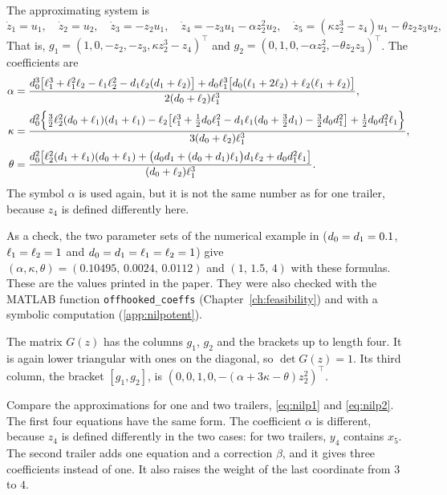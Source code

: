 The approximating system is
\begin{equation}
  \dot z_1=u_1,\quad \dot z_2=u_2,\quad \dot z_3=-z_2u_1,\quad
  \dot z_4=-z_3u_1-\alpha z_2^{2}u_2,\quad
  \dot z_5=(\kappa z_2^{3}-z_4)u_1-\theta z_2z_3u_2 ,
  \label{eq:nilp2}
\end{equation}
That is, $g_1=(1,0,-z_2,-z_3,\kappa z_2^3-z_4)^\top$ and
$g_2=(0,1,0,-\alpha z_2^2,-\theta z_2z_3)^\top$. The coefficients are
\begin{align}
  \alpha&=\frac{d_0^{3}\bigl[\ell_1^{3}+\ell_1^{2}\ell_2-\ell_1\ell_2^{2}-d_1\ell_2(d_1+\ell_2)\bigr]
         +d_0\ell_1^{3}\bigl[d_0(\ell_1+2\ell_2)+\ell_2(\ell_1+\ell_2)\bigr]}
         {2(d_0+\ell_2)\ell_1^{3}},\\[2pt]
  \kappa&=\frac{d_0^{2}\Bigl\{\tfrac32\ell_2^{2}(d_0+\ell_1)(d_1+\ell_1)
         -\ell_2\bigl[\ell_1^{3}+\tfrac12d_0\ell_1^{2}-d_1\ell_1(d_0+\tfrac32d_1)
         -\tfrac32d_0d_1^{2}\bigr]+\tfrac12d_0d_1^{2}\ell_1\Bigr\}}
         {3(d_0+\ell_2)\ell_1^{3}},\\[2pt]
  \theta&=\frac{d_0^{2}\bigl[\ell_2^{2}(d_1+\ell_1)(d_0+\ell_1)
         +\bigl(d_0d_1+(d_0+d_1)\ell_1\bigr)d_1\ell_2+d_0d_1^{2}\ell_1\bigr]}
         {(d_0+\ell_2)\ell_1^{3}} .
\end{align}
The symbol $\alpha$ is used again, but it is not the same number as for one
trailer, because $z_4$ is defined differently here.

As a check, the two parameter sets of the numerical example in
\cite{zuyev2024} ($d_0=d_1=0.1$, $\ell_1=\ell_2=1$ and
$d_0=d_1=\ell_1=\ell_2=1$) give $(\alpha,\kappa,\theta)=(0.10495,\,0.0024,\,0.0112)$
and $(1,\,1.5,\,4)$ with these formulas. These are the values printed in the
paper. They were also checked with the MATLAB function
\texttt{offhooked\_coeffs} (Chapter~\ref{ch:feasibility}) and with a symbolic
computation (\cref{app:nilpotent}).
\TODO[the denominator of alpha in eq. (11) of the paper seems to contain $\ell_2^3$, but the derivation here gives $\ell_1^3$; the examples cannot tell because $\ell_1=\ell_2$ there; check the PDF]

The matrix $G(z)$ has the columns $g_1$, $g_2$ and the brackets up to length
four. It is again lower triangular with ones on the diagonal, so
$\det G(z)=1$. Its third column, the bracket $[g_1,g_2]$, is
$(0,0,1,0,-(\alpha+3\kappa-\theta)z_2^{2})^\top$.

Compare the approximations for one and two trailers, \eqref{eq:nilp1} and
\eqref{eq:nilp2}. The first four equations have the same form. The coefficient
$\alpha$ is different, because $z_4$ is defined differently in the two cases: for
two trailers, $y_4$ contains $x_5$. The second trailer adds one equation and a
correction $\beta$, and it gives three coefficients instead of one. It also
raises the weight of the last coordinate from $3$ to $4$.

